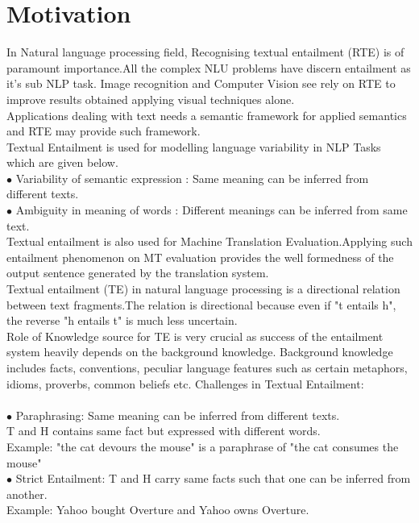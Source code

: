 \documentclass[12pt,a4paper]{article}
\begin{document}
\section{Motivation}
In Natural language processing field, Recognising textual entailment (RTE) is of \\paramount importance.All the complex NLU problems have discern entailment as it's sub NLP task. Image recognition and Computer Vision see rely on RTE to improve results obtained applying visual techniques alone.\\
Applications dealing with text needs a semantic framework for applied semantics and RTE may provide such framework.\\
\newpage
Textual Entailment is used for modelling language variability in NLP Tasks which are given below.\\
$\bullet$ Variability of semantic expression : Same meaning can be inferred from different texts.\\	
$\bullet$ Ambiguity in meaning of words : Different meanings can be inferred from same text.
\\
Textual entailment is also used for Machine Translation Evaluation.Applying such entailment phenomenon on MT evaluation provides the well formedness of the output sentence
generated by the translation system.\\
Textual entailment (TE) in natural language processing is a directional relation between text fragments.The relation is directional because even if "t entails h", the reverse "h entails t" is much less uncertain.\\

Role of Knowledge source for TE is very crucial as success of the entailment system heavily depends
on the background knowledge. Background knowledge includes facts, conventions, peculiar language features such as certain metaphors, idioms, proverbs,
common beliefs etc. 
Challenges in Textual Entailment:
\\~\\
$\bullet$ Paraphrasing: Same meaning can be inferred from different texts.\\	
T and H contains same fact but expressed with different words.\\
Example: "the cat devours the mouse"
              is a paraphrase of 
          "the cat consumes the mouse" \\
$\bullet$ Strict Entailment: T and H carry same facts such that one can be inferred from another.\\
Example: Yahoo bought Overture and Yahoo owns Overture.	
\end{document}

